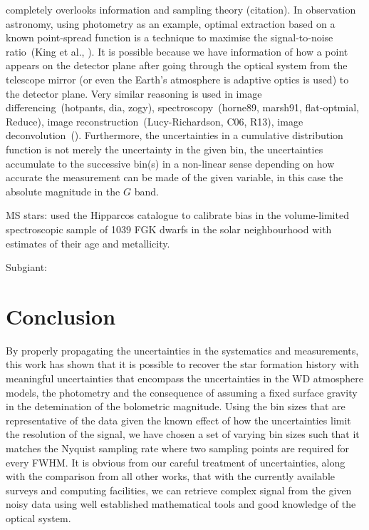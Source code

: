 \documentclass[fleqn,usenatbib]{mnras}
\begin{document}
\citep{2023MNRAS.522.1643C} completely overlooks information and
sampling theory (citation). In observation astronomy, using photometry as an
example, optimal extraction based on a known point-spread function
is a technique to maximise the signal-to-noise ratio~(King et al., ).
It is possible
because we have information of how a point appears on the detector
plane after going through the optical system from the telescope
mirror (or even the Earth's atmosphere is adaptive optics is used)
to the detector plane. Very similar reasoning is used in
image differencing~(hotpants, dia, zogy),
spectroscopy~(horne89, marsh91, flat-optmial, Reduce),
image reconstruction~(Lucy-Richardson, C06, R13),
image deconvolution~(). Furthermore, the uncertainties in a cumulative
distribution function is not merely the uncertainty in the given bin,
the uncertainties accumulate to the successive bin(s) in a non-linear
sense depending on how accurate the measurement can be made of the given
variable, in this case the absolute magnitude in the $G$ band.


MS stars:
\citep{2007ApJ...665..767R} used the Hipparcos catalogue to calibrate
bias in the \citep{2005ApJS..159..141V} volume-limited spectroscopic
sample of 1039 FGK dwarfs in the solar neighbourhood with estimates of
their age and metallicity.

\citep{2006A&A...459..783C}
\citep{2019A&A...624L...1M}

Subgiant:
\citep{2022Natur.603..599X}


\section{Conclusion}
By properly propagating the uncertainties in the
systematics and measurements, this work has shown that it is
possible to recover the star formation history with meaningful
uncertainties that encompass the uncertainties in the WD atmosphere
models, the photometry and the consequence of assuming a fixed
surface gravity in the detemination of the bolometric magnitude.
Using the bin sizes that are representative of the data given the
known effect of how the uncertainties limit the resolution of
the signal, we have chosen a set of varying bin sizes such that
it matches the Nyquist sampling rate where two sampling points are
required for every FWHM. It is obvious from our careful treatment
of uncertainties, along with the comparison from all other
works, that with the currently available surveys and computing
facilities, we can retrieve complex signal from the given noisy
data using well established mathematical tools and good knowledge
of the optical system.
\end{document}
